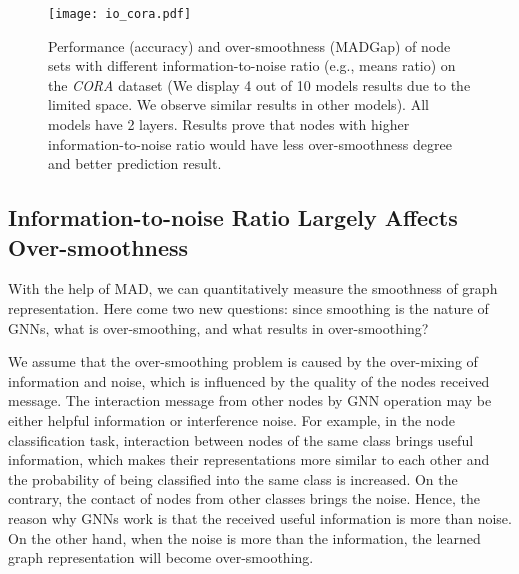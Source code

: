 \documentclass[letterpaper]{article} \usepackage{aaai20}  \usepackage{times}  \usepackage{helvet} \usepackage{courier}  \usepackage[hyphens]{url}  \usepackage{graphicx} \urlstyle{rm} \def\UrlFont{\rm}  \frenchspacing  \setlength{\pdfpagewidth}{8.5in}  \setlength{\pdfpageheight}{11in}  \setcounter{secnumdepth}{0}
\begin{document}
\begin{figure*}
\centering
\texttt{[image: io\_cora.pdf]}
\caption{Performance (accuracy) and over-smoothness (MADGap) of node sets with different information-to-noise ratio (e.g.,  means ratio) on the \textit{CORA} dataset (We display 4 out of 10 models results due to the limited space. We observe similar results in other models). All models have 2 layers. Results prove that nodes with higher information-to-noise ratio would have less over-smoothness degree and better prediction result.}
\label{figure_info_noise}
\end{figure*}


\subsection{Information-to-noise Ratio Largely Affects Over-smoothness}

With the help of MAD, we can quantitatively measure the smoothness of graph representation. Here come two new questions: since smoothing is the nature of GNNs, what is over-smoothing, and what results in over-smoothing?

We assume that the over-smoothing problem is caused by the over-mixing of information and noise, which is influenced by the quality of the nodes received message.
The interaction message from other nodes by GNN operation may be either helpful information or interference noise.
For example, in the node classification task, interaction between nodes of the same class brings useful information, which makes their representations more similar to each other and the probability of being classified into the same class is increased. 
On the contrary, the contact of nodes from other classes brings the noise. Hence, the reason why GNNs work is that the received useful information is more than noise. On the other hand, when the noise is more than the information, the learned graph representation will become over-smoothing.
\end{document}

